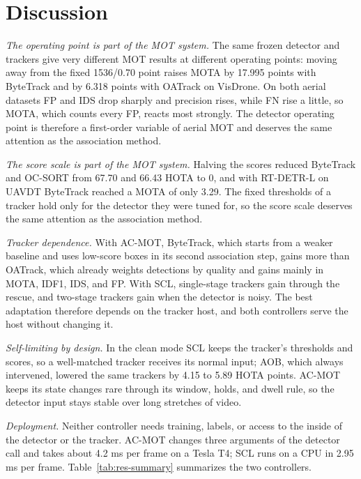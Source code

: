 \section{Discussion}\label{sec:res-discussion}

\emph{The operating point is part of the MOT system.} The same frozen detector and trackers give very different MOT results at different operating points: moving away from the fixed 1536/0.70 point raises MOTA by 17.995 points with ByteTrack and by 6.318 points with OATrack on VisDrone. On both aerial datasets FP and IDS drop sharply and precision rises, while FN rise a little, so MOTA, which counts every FP, reacts most strongly. The detector operating point is therefore a first-order variable of aerial MOT and deserves the same attention as the association method.

\emph{The score scale is part of the MOT system.} Halving the scores reduced ByteTrack and OC-SORT from 67.70 and 66.43 HOTA to 0, and with RT-DETR-L on UAVDT ByteTrack reached a MOTA of only 3.29. The fixed thresholds of a tracker hold only for the detector they were tuned for, so the score scale deserves the same attention as the association method.

\emph{Tracker dependence.} With AC-MOT, ByteTrack, which starts from a weaker baseline and uses low-score boxes in its second association step, gains more than OATrack, which already weights detections by quality and gains mainly in MOTA, IDF1, IDS, and FP. With SCL, single-stage trackers gain through the rescue, and two-stage trackers gain when the detector is noisy. The best adaptation therefore depends on the tracker host, and both controllers serve the host without changing it.

\emph{Self-limiting by design.} In the clean mode SCL keeps the tracker's thresholds and scores, so a well-matched tracker receives its normal input; AOB, which always intervened, lowered the same trackers by 4.15 to 5.89 HOTA points. AC-MOT keeps its state changes rare through its window, holds, and dwell rule, so the detector input stays stable over long stretches of video.

\emph{Deployment.} Neither controller needs training, labels, or access to the inside of the detector or the tracker. AC-MOT changes three arguments of the detector call and takes about 4.2 ms per frame on a Tesla T4; SCL runs on a CPU in 2.95 ms per frame. Table~\ref{tab:res-summary} summarizes the two controllers.


